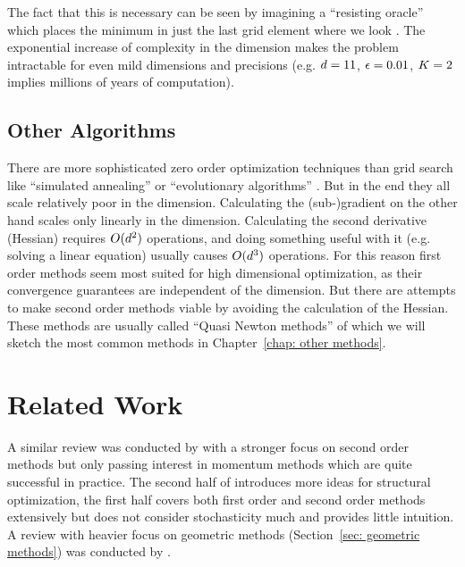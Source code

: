 The fact that this is necessary can be seen by imagining a ``resisting
oracle'' which places the minimum in just the last grid element where we look
\parencite[cf.][p. 13]{nesterovLecturesConvexOptimization2018}. The exponential
increase of complexity in the dimension makes the problem intractable for even
mild dimensions and precisions (e.g. \(d=11\), \(\epsilon=0.01\), \(K=2\)
implies millions of years of computation).

\subsection{Other Algorithms}

There are more sophisticated zero order optimization techniques than grid
search like ``simulated annealing'' \parencite[e.g.][]{bouttierConvergenceRateSimulated2019}
or ``evolutionary algorithms'' \parencite[e.g.][]{heConditionsConvergenceEvolutionary2001}.
But in the end they all scale relatively poor in the dimension. Calculating the
\mbox{(sub-)gradient} on the other hand scales only linearly in the dimension.
Calculating the second derivative (Hessian) requires \(O(d^2)\)
operations, and doing something useful with it (e.g. solving a linear
equation) usually causes \(O(d^3)\) operations. For this reason first
order methods seem most suited for high dimensional optimization, as their
convergence guarantees are independent of the dimension. But there are attempts
to make second order methods viable by avoiding the calculation of the Hessian.
These methods are usually called ``Quasi Newton methods'' of which we will 
sketch the most common methods in Chapter~\ref{chap: other methods}.

\section{Related Work}

A similar review was conducted by
\textcite{bottouOptimizationMethodsLargeScale2018} with a stronger focus on
second order methods but only passing interest in
momentum methods which are quite successful in practice.
The second half of \textcite{nesterovLecturesConvexOptimization2018} introduces
more ideas for structural optimization, the first half covers both first order
and second order methods extensively but does not consider stochasticity much
and provides little intuition.
A review with heavier focus on geometric methods (Section~\ref{sec: geometric methods}) 
was conducted by \textcite{bubeckConvexOptimizationAlgorithms2015}.

